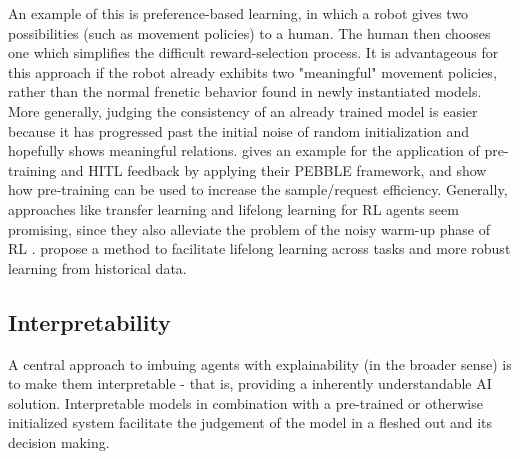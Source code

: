 \documentclass[twoside,11pt]{article}
\begin{document}
An example of this is preference-based learning, in which a robot gives two possibilities (such as movement policies) to a human. The human then chooses one which simplifies the difficult reward-selection process. It is advantageous for this approach if the robot already exhibits two "meaningful" movement policies, rather than the normal frenetic behavior found in newly instantiated models.
More generally, judging the consistency of an already trained model is easier because it has progressed past the initial noise of random initialization and hopefully shows meaningful relations. \citet{LeeSmithAbbeel:2021:FeedbackPreferenceHITLLearningPEBBLE} gives an example for the application of pre-training and HITL feedback by applying their PEBBLE framework, and show how pre-training can be used to increase the sample/request efficiency.
Generally, approaches like transfer learning and lifelong learning for RL agents seem promising, since they also alleviate the problem of the noisy warm-up phase of RL \citep{taylor2009transfer,yang2021efficient}. \citet{AzarLazaricBrunskill:2013:LifelongLearning} propose a method to facilitate lifelong learning across tasks and more robust learning from historical data.

\subsection{Interpretability}
\label{subsec:interpretability}

A central approach to imbuing agents with explainability (in the broader sense) is to make them interpretable - that is, providing a inherently understandable AI solution. Interpretable models in combination with a pre-trained or otherwise initialized system facilitate the judgement of the model in a fleshed out and its decision making.
\end{document}
